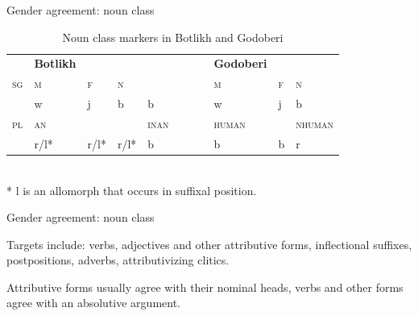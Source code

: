 \begin{frame}{Gender agreement: noun class}

\begin{table}[H]
\caption{Noun class markers in Botlikh and Godoberi}
\begin{center}
\label{tab:nounclass}
\begin{tabular}{lllllllllll}
   & \textbf{Botlikh} & \textbf{} & \textbf{} & \textbf{} &  &  & \textbf{} & \textbf{Godoberi}   &     &          \\
\textsc{sg} & \textsc{m}                & \textsc{f}         & \textsc{n}         &           &  &  &           & \textsc{m}                   & \textsc{f}   & \textsc{n}        \\
   & w                & j         & b         & b         &  &  &           & w                   & j   & b        \\
\textsc{pl} & \multicolumn{3}{l}{\textsc{an}}                   & \textsc{inan}      &  &  &           & \multicolumn{2}{l}{\textsc{human}} & \textsc{nhuman} \\
   & r/l*             & r/l*      & r/l*      & b         &  &  &           & b                   & b   & r       
\end{tabular}\\
\vspace{0.5cm}
* l is an allomorph that occurs in suffixal position.
\end{center}
\end{table}

\end{frame}

\begin{frame}{Gender agreement: noun class}

Targets include: verbs, adjectives and other attributive forms, inflectional suffixes, postpositions, adverbs, attributivizing clitics.

\pause 


\pause

Attributive forms usually agree with their nominal heads, verbs and other forms agree with an absolutive argument.

\end{frame}

